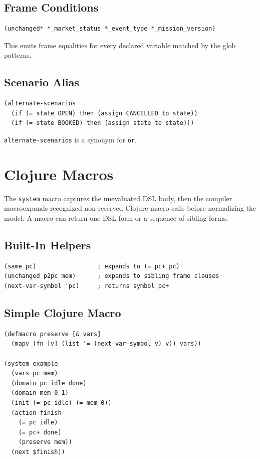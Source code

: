 \documentclass[11pt]{article}
\begin{document}
\subsection{Frame Conditions}

\begin{lstlisting}[language=CDSTR]
(unchanged* *_market_status *_event_type *_mission_version)
\end{lstlisting}

This emits frame equalities for every declared variable matched by the glob
patterns.

\subsection{Scenario Alias}

\begin{lstlisting}[language=CDSTR]
(alternate-scenarios
  (if (= state OPEN) then (assign CANCELLED to state))
  (if (= state BOOKED) then (assign state to state)))
\end{lstlisting}

\texttt{alternate-scenarios} is a synonym for \texttt{or}.

\section{Clojure Macros}

The \texttt{system} macro captures the unevaluated DSL body, then the compiler
macroexpands recognized non-reserved Clojure macro calls before normalizing the
model.  A macro can return one DSL form or a sequence of sibling forms.

\subsection{Built-In Helpers}

\begin{lstlisting}[language=CDSTR]
(same pc)                 ; expands to (= pc+ pc)
(unchanged p2pc mem)      ; expands to sibling frame clauses
(next-var-symbol 'pc)     ; returns symbol pc+
\end{lstlisting}

\subsection{Simple Clojure Macro}

\begin{lstlisting}[language=CDSTR]
(defmacro preserve [& vars]
  (mapv (fn [v] (list '= (next-var-symbol v) v)) vars))

(system example
  (vars pc mem)
  (domain pc idle done)
  (domain mem 0 1)
  (init (= pc idle) (= mem 0))
  (action finish
    (= pc idle)
    (= pc+ done)
    (preserve mem))
  (next $finish))
\end{lstlisting}
\end{document}
